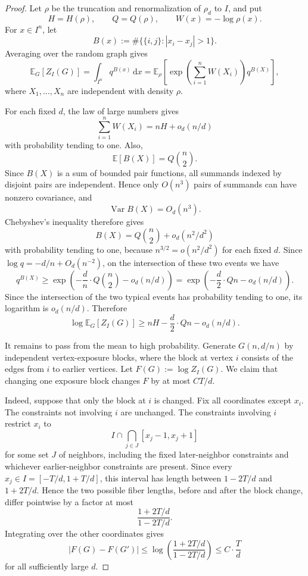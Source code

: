 \documentclass[11pt]{article}
\theoremstyle{definition}
\newcommand{\EE}{\mathbb{E}}
\newcommand{\dd}{\,\mathrm{d}}
\begin{document}
\begin{proof}
Let $\rho$ be the truncation and renormalization of $\rho_d$ to $I$, and put
\[
  H=H(\rho),\qquad Q=Q(\rho),\qquad W(x)=-\log\rho(x).
\]
For $x\in I^n$, let
\[
  B(x):=\#\{\{i,j\}: |x_i-x_j|>1\}.
\]
Averaging over the random graph gives
\[
  \EE_G \left[Z_I(G)\right]=\int_{I^n} q^{B(x)}\dd x
  =\EE_\rho\left[\exp\left(\sum_{i=1}^n W(X_i)\right)q^{B(X)}\right],
\]
where $X_1,\ldots,X_n$ are independent with density $\rho$.

\bigskip
\noindent
For each fixed $d$, the law of large numbers gives
\[
  \sum_{i=1}^n W(X_i)=nH+o_d(n/d)
\]
with probability tending to one.  Also,
\[
  \EE \left[B(X)\right]=Q\binom n2.
\]
Since $B(X)$ is a sum of bounded pair functions, all summands indexed by disjoint pairs are independent.  Hence only $O(n^3)$ pairs of summands can have nonzero covariance, and
\[
  \operatorname{Var} B(X)=O_d(n^3).
\]
Chebyshev's inequality therefore gives
\[
  B(X)=Q\binom n2+o_d(n^2/d^2)
\]
with probability tending to one, because $n^{3/2}=o(n^2/d^2)$ for each fixed $d$.  Since $\log q=-d/n+O_d(n^{-2})$, on the intersection of these two events we have
\[
  q^{B(X)}
  \ge
  \exp\left(-\frac dn\cdot Q\binom n2-o_d(n/d)\right)
  =\exp\left(-\frac d2 \cdot Qn-o_d(n/d)\right).
\]
Since the intersection of the two typical events has probability tending to one, its logarithm is $o_d(n/d)$.  Therefore
\begin{equation}\label{eq:EZ-random-lower}
  \log \EE_G \left[Z_I(G)\right]
  \ge
  nH-\frac d2\cdot Qn-o_d(n/d).
\end{equation}

\bigskip
\noindent
It remains to pass from the mean to high probability.  Generate $G(n,d/n)$ by independent vertex-exposure blocks, where the block at vertex $i$ consists of the edges from $i$ to earlier vertices.  Let $F(G):=\log Z_I(G)$.  We claim that changing one exposure block changes $F$ by at most $C T/d$.

\bigskip
\noindent
Indeed, suppose that only the block at $i$ is changed.  Fix all coordinates except $x_i$.  The constraints not involving $i$ are unchanged.  The constraints involving $i$ restrict $x_i$ to
\[
  I\cap\bigcap_{j\in J}[x_j-1,x_j+1]
\]
for some set $J$ of neighbors, including the fixed later-neighbor constraints and whichever earlier-neighbor constraints are present.  Since every $x_j\in I=[-T/d,1+T/d]$, this interval has length between $1-2T/d$ and $1+2T/d$.  Hence the two possible fiber lengths, before and after the block change, differ pointwise by a factor at most
\[
  \frac{1+2T/d}{1-2T/d}.
\]
Integrating over the other coordinates gives
\[
  |F(G)-F(G')|
  \le \log\left(\frac{1+2T/d}{1-2T/d}\right)
  \le C\cdot\frac{T}{d}
\]
for all sufficiently large $d$.


\end{proof}
\end{document}
